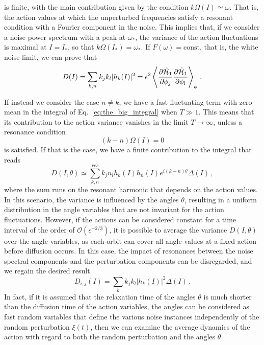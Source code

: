is finite, with the main contribution given by the condition $k\Omega(I)\simeq \omega$. That is, the action values at which the unperturbed frequencies satisfy a resonant condition with a Fourier component in the noise. This implies that, if we consider a noise power spectrum with a peak at $\omega_\ast$, the variance of the action fluctuations is maximal at $I=I_\ast$, so that $k\Omega(I_\ast)=\omega_\ast$. If $F(\omega)=\mathrm{const}$, that is, the white noise limit, we can prove that
\begin{equation}
    D(I)=\sum_{k,n} k_j k_l |h_k(I)|^2 =\epsilon^2\left \langle \frac{\partial \hat {\mathcal{H}}_1}{\partial \phi_j}\frac{\partial \hat {\mathcal{H}}_1}{\partial \phi_l}\right \rangle_\phi\,.
\end{equation}

If instead we consider the case $n\neq k$, we have a fast fluctuating term with zero mean in the integral of Eq.~\eqref{eq:the_big_integral} when $T\gg 1$. This means that its contribution to the action variance vanishes in the limit $T\to\infty$, unless a resonance condition
\begin{equation}
    (k-n)\Omega(I)=0
\end{equation}
is satisfied. If that is the case, we have a finite contribution to the integral that reads
\begin{equation}
    D(I,\theta)\simeq \sum_{k,n}^{res} k_j n_l h_k(I) \overline{h}_n(I) e^{i (k-n)\theta}\Delta (I)\,,
\end{equation}
where the sum runs on the resonant harmonic that depends on the action values. In this scenario, the variance is influenced by the angles $\theta$, resulting in a uniform distribution in the angle variables that are not invariant for the action fluctuations. However, if the actions can be considered constant for a time interval of the order of $\mathcal{O}(\epsilon^{-2/3})$, it is possible to average the variance $D(I,\theta)$ over the angle variables, as each orbit can cover all angle values at a fixed action before diffusion occurs. In this case, the impact of resonances between the noise spectral components and the perturbation components can be disregarded, and we regain the desired result
\begin{equation}
    D_{i,j}(I)=\sum_{k} k_j k_l |h_k(I)|^2 \Delta(I)\,.
    \label{diffcoef}
\end{equation}
In fact, if it is assumed that the relaxation time of the angles $\theta$ is much shorter than the diffusion time of the action variables, the angles can be considered as fast random variables that define the various noise instances independently of the random perturbation $\xi(t)$, then we can examine the average dynamics of the action with regard to both the random perturbation and the angles $\theta$
